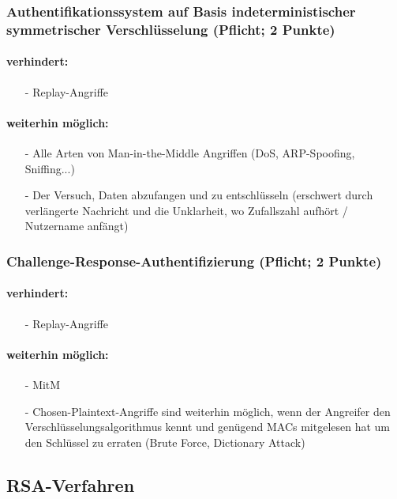 \documentclass{article}
\begin{document}
\subsubsection{Authentifikationssystem auf Basis indeterministischer symmetrischer Verschlüsselung (Pflicht; 2 Punkte)}
\paragraph{verhindert:}
\begin{itemize}
	\item[-] Replay-Angriffe
\end{itemize}
\paragraph{weiterhin möglich:}
\begin{itemize}
	\item[-] Alle Arten von Man-in-the-Middle Angriffen (DoS, ARP-Spoofing, Sniffing...)
	\item[-] Der Versuch, Daten abzufangen und zu entschlüsseln (erschwert durch verlängerte Nachricht und die Unklarheit, wo Zufallszahl aufhört / Nutzername anfängt)
\end{itemize}
\subsubsection{Challenge-Response-Authentifizierung (Pflicht; 2 Punkte) }
\paragraph{verhindert:}
\begin{itemize}
	\item[-] Replay-Angriffe
\end{itemize}
\paragraph{weiterhin möglich:}
\begin{itemize}
	\item[-] MitM
	\item[-] Chosen-Plaintext-Angriffe sind weiterhin möglich, wenn der Angreifer den Verschlüsselungsalgorithmus kennt und genügend MACs mitgelesen hat um den Schlüssel zu erraten (Brute Force, Dictionary Attack)
\end{itemize}

\subsection{RSA-Verfahren}
\end{document}
